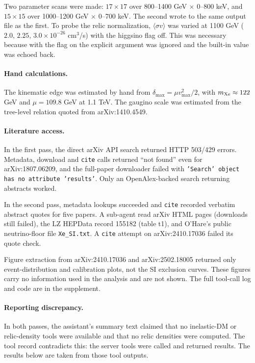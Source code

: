 \documentclass[11pt,a4paper]{article}
\begin{document}
Two parameter scans were made: $17\times17$ over 800--1400 GeV $\times$ 0--800 keV, and $15\times15$ over 1000--1200 GeV $\times$ 0--700 keV. The second wrote to the same output file as the first. To probe the relic normalization, $\langle\sigma v\rangle$ was varied at 1100 GeV ($2.0$, $2.25$, $3.0\times10^{-26}$ cm$^3$/s) with the higgsino flag off. This was necessary because with the flag on the explicit argument was ignored and the built-in value was echoed back.

\paragraph{Hand calculations.} The kinematic edge was estimated by hand from $\delta_{\max}=\mu v_{\max}^2/2$, with $m_{\rm Xe}\approx122$ GeV and $\mu=109.8$ GeV at 1.1 TeV. The gaugino scale was estimated from the tree-level relation quoted from arXiv:1410.4549.

\paragraph{Literature access.} In the first pass, the direct arXiv API search returned HTTP 503/429 errors. Metadata, download and \texttt{cite} calls returned ``not found'' even for arXiv:1807.06209, and the full-paper downloader failed with \texttt{'Search' object has no attribute 'results'}. Only an OpenAlex-backed search returning abstracts worked.

In the second pass, metadata lookups succeeded and \texttt{cite} recorded verbatim abstract quotes for five papers. A sub-agent read arXiv HTML pages (downloads still failed), the LZ HEPData record 155182 (table t1), and O'Hare's public neutrino-floor file \texttt{Xe\_SI.txt}. A \texttt{cite} attempt on arXiv:2410.17036 failed its quote check.

Figure extraction from arXiv:2410.17036 and arXiv:2502.18005 returned only event-distribution and calibration plots, not the SI exclusion curves. These figures carry no information used in the analysis and are not shown. The full tool-call log and code are in the supplement.

\paragraph{Reporting discrepancy.} In both passes, the assistant's summary text claimed that no inelastic-DM or relic-density tools were available and that no relic densities were computed. The tool record contradicts this: the server tools were called and returned results. The results below are taken from those tool outputs.
\end{document}

